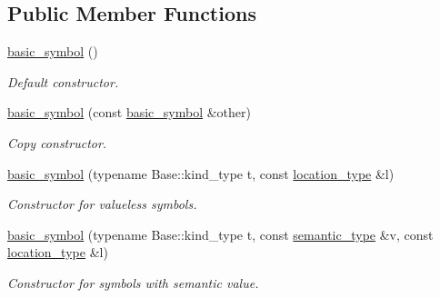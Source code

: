 \subsection*{Public Member Functions}
\begin{DoxyCompactItemize}
\item 
\mbox{\label{structyy_1_1parser_1_1basic__symbol_a4c089d17ee545d109ca5660fbaa05b95}} 
\hyperlink{structyy_1_1parser_1_1basic__symbol_a4c089d17ee545d109ca5660fbaa05b95}{basic\+\_\+symbol} ()
\begin{DoxyCompactList}\small\item\em Default constructor. \end{DoxyCompactList}\item 
\mbox{\label{structyy_1_1parser_1_1basic__symbol_a840c58a9a75349d49586d6d0701dc0d9}} 
\hyperlink{structyy_1_1parser_1_1basic__symbol_a840c58a9a75349d49586d6d0701dc0d9}{basic\+\_\+symbol} (const \hyperlink{structyy_1_1parser_1_1basic__symbol}{basic\+\_\+symbol} \&other)
\begin{DoxyCompactList}\small\item\em Copy constructor. \end{DoxyCompactList}\item 
\mbox{\label{structyy_1_1parser_1_1basic__symbol_abdf7d69f91fb6f36e7f29064cee8633c}} 
\hyperlink{structyy_1_1parser_1_1basic__symbol_abdf7d69f91fb6f36e7f29064cee8633c}{basic\+\_\+symbol} (typename Base\+::kind\+\_\+type t, const \hyperlink{classyy_1_1parser_a6cee0517f5ed9774dd68ee189b62e454}{location\+\_\+type} \&l)
\begin{DoxyCompactList}\small\item\em Constructor for valueless symbols. \end{DoxyCompactList}\item 
\mbox{\label{structyy_1_1parser_1_1basic__symbol_afe795425ec70e3ec0cbcc2917b09be57}} 
\hyperlink{structyy_1_1parser_1_1basic__symbol_afe795425ec70e3ec0cbcc2917b09be57}{basic\+\_\+symbol} (typename Base\+::kind\+\_\+type t, const \hyperlink{classyy_1_1parser_abb6ca82d9e84da6d4b98e65f650b2456}{semantic\+\_\+type} \&v, const \hyperlink{classyy_1_1parser_a6cee0517f5ed9774dd68ee189b62e454}{location\+\_\+type} \&l)
\begin{DoxyCompactList}\small\item\em Constructor for symbols with semantic value. \end{DoxyCompactList}\item 

\end{DoxyCompactItemize}
